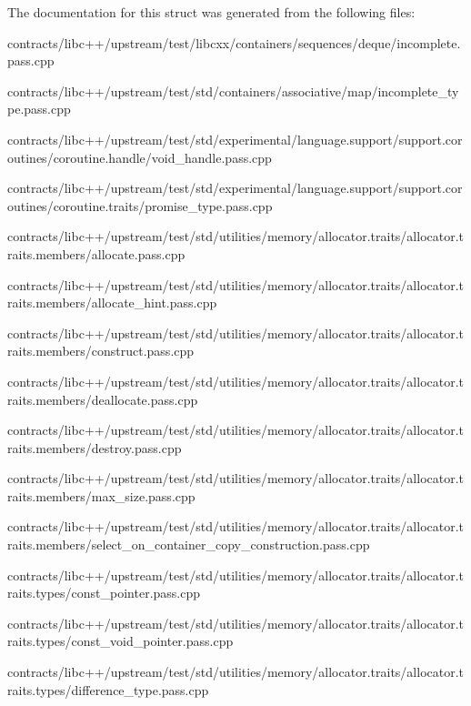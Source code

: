 The documentation for this struct was generated from the following files\+:\begin{DoxyCompactItemize}
\item 
contracts/libc++/upstream/test/libcxx/containers/sequences/deque/incomplete.\+pass.\+cpp\item 
contracts/libc++/upstream/test/std/containers/associative/map/incomplete\+\_\+type.\+pass.\+cpp\item 
contracts/libc++/upstream/test/std/experimental/language.\+support/support.\+coroutines/coroutine.\+handle/void\+\_\+handle.\+pass.\+cpp\item 
contracts/libc++/upstream/test/std/experimental/language.\+support/support.\+coroutines/coroutine.\+traits/promise\+\_\+type.\+pass.\+cpp\item 
contracts/libc++/upstream/test/std/utilities/memory/allocator.\+traits/allocator.\+traits.\+members/allocate.\+pass.\+cpp\item 
contracts/libc++/upstream/test/std/utilities/memory/allocator.\+traits/allocator.\+traits.\+members/allocate\+\_\+hint.\+pass.\+cpp\item 
contracts/libc++/upstream/test/std/utilities/memory/allocator.\+traits/allocator.\+traits.\+members/construct.\+pass.\+cpp\item 
contracts/libc++/upstream/test/std/utilities/memory/allocator.\+traits/allocator.\+traits.\+members/deallocate.\+pass.\+cpp\item 
contracts/libc++/upstream/test/std/utilities/memory/allocator.\+traits/allocator.\+traits.\+members/destroy.\+pass.\+cpp\item 
contracts/libc++/upstream/test/std/utilities/memory/allocator.\+traits/allocator.\+traits.\+members/max\+\_\+size.\+pass.\+cpp\item 
contracts/libc++/upstream/test/std/utilities/memory/allocator.\+traits/allocator.\+traits.\+members/select\+\_\+on\+\_\+container\+\_\+copy\+\_\+construction.\+pass.\+cpp\item 
contracts/libc++/upstream/test/std/utilities/memory/allocator.\+traits/allocator.\+traits.\+types/const\+\_\+pointer.\+pass.\+cpp\item 
contracts/libc++/upstream/test/std/utilities/memory/allocator.\+traits/allocator.\+traits.\+types/const\+\_\+void\+\_\+pointer.\+pass.\+cpp\item 
contracts/libc++/upstream/test/std/utilities/memory/allocator.\+traits/allocator.\+traits.\+types/difference\+\_\+type.\+pass.\+cpp\item 

\end{DoxyCompactItemize}
